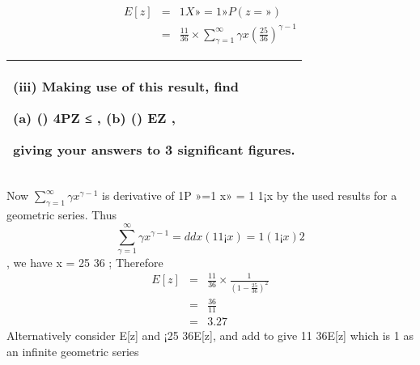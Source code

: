 \documentclass[a4paper,12pt]{article}
\begin{document}
\begin{enumerate}
\begin{eqnarray*}
E[z] &=&
1X
»=1
»P(z = ») \\ &=& \frac{11}{36} \times \sum^{\infty}_{\gamma=1} \gamma x 
\left(\frac{25}{36}
\right)^{\gamma-1}
\end{eqnarray*}
  \begin{table}[ht!]
     \centering
     \begin{tabular}{|p{15cm}|}
     \hline  
(iii) Making use of this result, find 
 
(a) () 4PZ ≤ , (b) () EZ , 
 
giving your answers to 3 significant figures. 
 \\ \hline 
      \end{tabular}
    \end{table}
Now
$\sum^{\infty}_{\gamma=1} \gamma x ^{\gamma-1}$ is derivative of
1P
»=1
x» = 1
1¡x by the used results for a geometric series.
Thus
\[\sum^{\infty}_{\gamma=1} \gamma x ^{\gamma-1} = d
dx ( 1
1¡x ) = 1
(1¡x)2 \], we have x = 25
36 ;
Therefore
\begin{eqnarray*}
E[z] &=& \frac{11}{36} \times \frac{1}{(1- \frac{25}{36})^2} \\ &=& \frac{36}{11} 
\\ &=& 3.27
\end{eqnarray*}
Alternatively consider E[z] and ¡25
36E[z], and add to give 11
36E[z] which is 1 as an
infinite geometric series
\end{enumerate}
\end{document}
